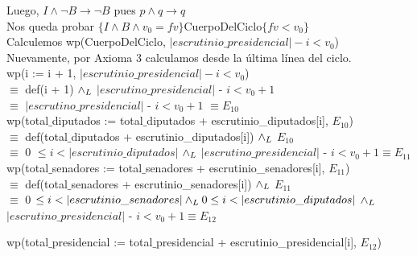 \documentclass[10pt,a4paper]{article}
\begin{document}
\noindent Luego, $I \land \neg B \rightarrow \neg B$ pues $p \land q \rightarrow q$ \\

\noindent Nos queda probar $\{I \land B \land v_0 = fv\}$CuerpoDelCiclo$\{fv < v_0\}$ \\

\noindent Calculemos wp(CuerpoDelCiclo, $|escrutinio\_presidencial| - i < v_0$) \\

\noindent Nuevamente, por Axioma 3 calculamos desde la última línea del ciclo. \vspace{0.1cm} \\

\noindent wp(i := i + 1, $|escrutinio\_presidencial| - i < v_0$) \\

\noindent $\equiv$ def(i + 1) $\land _L$ $|escrutino\_presidencial|$  - $i < v_0 + 1$\\

\noindent $\equiv$ $|escrutino\_presidencial|$  - $i < v_0 + 1$ $\equiv E_{10}$ \vspace{0.3cm} \\

\noindent wp(total$\_$diputados := total$\_$diputados + escrutinio\_diputados[i], $E_{10}$) \\

\noindent $\equiv$ def(total$\_$diputados + escrutinio\_diputados[i]) $\land _L$ $E_{10}$ \\

\noindent $\equiv$ 0 $\leq i < |escrutinio\_diputados|$ $\land _L$ $|escrutino\_presidencial|$  - $i < v_0 + 1 \equiv E_{11}$ \vspace{0.3cm}\\


\noindent wp(total$\_$senadores := total$\_$senadores + escrutinio\_senadores[i], $E_{11}$) \\

\noindent $\equiv$ def(total$\_$senadores + escrutinio\_senadores[i]) $\land _L$ $E_{11}$ \\

\noindent $\equiv$  0 $\leq i < |escrutinio\_senadores| \land _L 0 \leq i < |escrutinio\_diputados|$ $\land _L$ $|escrutino\_presidencial|$  - $i < v_0 + 1 \equiv E_{12} $ \vspace{0.3cm}\\

\newpage

\noindent wp(total$\_$presidencial := total$\_$presidencial + escrutinio\_presidencial[i], $E_{12}$) \\
\end{document}
